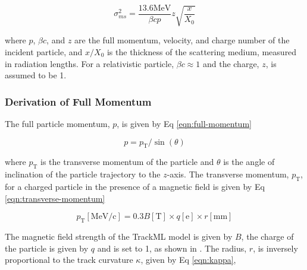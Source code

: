 

\begin{equation}
    \sigma_{ms}^{2} = \frac{13.6 \text{MeV}}{\beta c p} z \sqrt{\frac{x}{X_0}}
    \label{eqn:simplified-moliere-equation}
\end{equation}

where $p$, $\beta c$, and $z$ are the full momentum, velocity, and charge number of the incident particle, and $x/X_0$ is the thickness of the scattering medium, measured in radiation lengths. For a relativistic particle, $\beta c \approx 1$ and the charge, $z$, is assumed to be 1. 




\subsubsection{Derivation of Full Momentum}

The full particle momentum, $p$, is given by Eq \eqref{eqn:full-momentum}

\begin{equation}
    p = p_\text{T} / \sin(\theta)
    \label{eqn:full-momentum}
\end{equation}

where $p_\text{T}$ is the transverse momentum of the particle and $\theta$ is the angle of inclination of the particle trajectory to the $z$-axis. The transverse momentum, $p_\text{T}$, for a charged particle in the presence of a magnetic field is given by Eq \eqref{eqn:transverse-momentum}

\begin{equation}
    p_\text{T} [\text{MeV/c}] = 0.3 B [\text{T}] \times q [\text{e}] \times r [\text{mm}]
    \label{eqn:transverse-momentum}
\end{equation}

The magnetic field strength of the TrackML model is given by $B$, the charge of the particle is given by $q$ and is set to 1, as shown in \cite{ATLAS-CONF-2010-072}. The radius, $r$, is inversely proportional to the track curvature $\kappa$, given by Eq \eqref{eqn:kappa}, 

